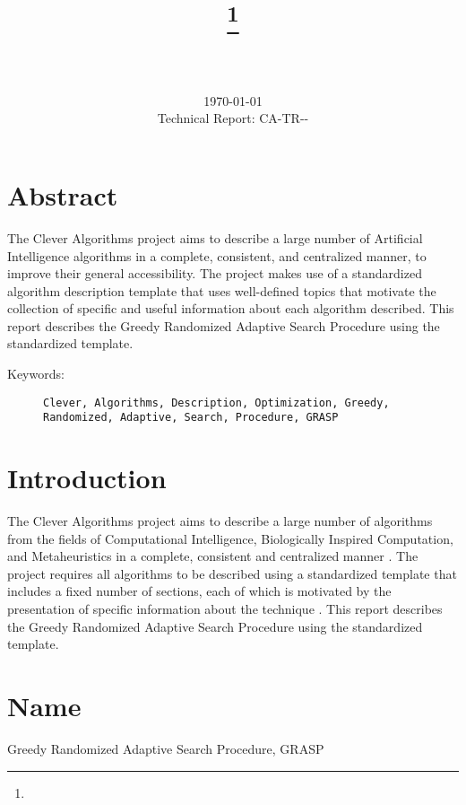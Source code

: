 \documentclass[a4paper, 11pt]{article}
\title{{\myreporttitle}\footnote{\myreportlicense}}
\author{\myreportauthor\\{\myreportemail}\\\small\myreportproject}
\date{\today\\{\small{Technical Report: CA-TR-{\myreportdate}-\myreportversion}}}
\begin{document}
\maketitle

\section*{Abstract} 
The Clever Algorithms project aims to describe a large number of Artificial Intelligence algorithms in a complete, consistent, and centralized manner, to improve their general accessibility. 
The project makes use of a standardized algorithm description template that uses well-defined topics that motivate the collection of specific and useful information about each algorithm described.
This report describes the Greedy Randomized Adaptive Search Procedure using the standardized template.

\begin{description}
	\item[Keywords:] {\small\texttt{Clever, Algorithms, Description, Optimization, Greedy, Randomized, Adaptive, Search, Procedure, GRASP}}
\end{description} 

\section{Introduction} 
\label{sec:intro}
The Clever Algorithms project aims to describe a large number of algorithms from the fields of Computational Intelligence, Biologically Inspired Computation, and Metaheuristics in a complete, consistent and centralized manner \cite{Brownlee2010}.
The project requires all algorithms to be described using a standardized template that includes a fixed number of sections, each of which is motivated by the presentation of specific information about the technique \cite{Brownlee2010a}.
This report describes the Greedy Randomized Adaptive Search Procedure using the standardized template.

\section{Name} 
\label{sec:name}
Greedy Randomized Adaptive Search Procedure, GRASP
\end{document}

